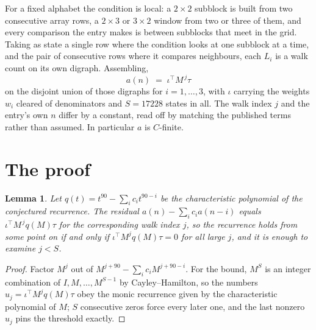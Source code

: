 \documentclass[11pt,a4paper]{article}
\theoremstyle{plain}
\newtheorem{lemma}[theorem]{Lemma}
\theoremstyle{definition}
\begin{document}
For a fixed alphabet the condition is local: a $2\times2$ subblock is built from two
consecutive array rows, a $2\times3$ or $3\times2$ window from two or three of them, and every
comparison the entry makes is between subblocks that meet in the grid. Taking as state a single
row where the condition looks at one subblock at a time, and the pair of consecutive rows where
it compares neighbours, each $L_i$ is a walk count on its own digraph. Assembling,
\[
a(n)\;=\;\iota^{\!\top}M^{\,j}\tau
\]
on the disjoint union of those digraphs for $i=1,\dots,3$, with $\iota$ carrying the weights
$w_i$ cleared of denominators and $S=17228$ states in all. The walk index $j$ and the entry's own
$n$ differ by a constant, read off by matching the published terms rather than assumed. In
particular $a$ is $C$-finite.

\section{The proof}

\begin{lemma}\label{lem:crit}
Let $q(t)=t^{90}-\sum_i c_it^{90-i}$ be the characteristic polynomial of the
conjectured recurrence. The residual $a(n)-\sum_ic_ia(n-i)$ equals
$\iota^{\!\top}M^{\,j}q(M)\tau$ for the corresponding walk index $j$, so the recurrence
holds from some point on if and only if $\iota^{\!\top}M^{j}q(M)\tau=0$ for all large $j$,
and it is enough to examine $j<S$.
\end{lemma}

\begin{proof}
Factor $M^{j}$ out of $M^{j+90}-\sum_ic_iM^{j+90-i}$. For the bound, $M^{S}$
is an integer combination of $I,M,\dots,M^{S-1}$ by Cayley--Hamilton, so the numbers
$u_j=\iota^{\!\top}M^{j}q(M)\tau$ obey the monic recurrence given by the characteristic
polynomial of $M$; $S$ consecutive zeros force every later one, and the last nonzero $u_j$
pins the threshold exactly.
\end{proof}
\end{document}
